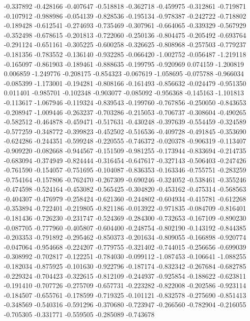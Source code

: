 -0.337892
-0.428166
-0.407647
-0.518818
-0.362718
-0.459975
-0.312861
-0.719871
-0.107912
-0.988986
-0.054139
-0.828536
-0.195134
-0.978387
-0.242722
-0.718802
-0.189428
-0.612541
-0.274693
-0.735469
-0.307961
-0.664065
-0.339329
-0.567929
-0.352498
-0.678615
-0.201813
-0.722060
-0.250136
-0.804475
-0.205492
-0.693764
-0.291124
-0.651161
-0.305225
-0.600258
-0.326625
-0.808968
-0.257503
-0.779237
-0.181356
-0.783552
-0.136140
-0.932285
-0.066420
-1.002752
-0.056487
-1.219118
-0.165097
-0.861903
-0.189461
-0.888635
-0.199795
-0.920969
0.074159
-1.200819
0.006859
-1.249776
-0.208175
-0.854323
-0.067619
-1.058695
-0.075788
-0.966034
-0.085399
-1.173001
-0.194281
-0.808166
-0.161493
-0.856632
-0.024479
-0.951350
0.011401
-0.985701
-0.102348
-0.903077
-0.085092
-0.956368
-0.145163
-1.101813
-0.113617
-1.067946
-0.119324
-0.839543
-0.199760
-0.767856
-0.250050
-0.843653
-0.208947
-1.009446
-0.263237
-0.703286
-0.215053
-0.706737
-0.308604
-0.490265
-0.582512
-0.464878
-0.459471
-0.517631
-0.430248
-0.397639
-0.554459
-0.324589
-0.577259
-0.348772
-0.399823
-0.452502
-0.516536
-0.409728
-0.491845
-0.353690
-0.624286
-0.244351
-0.599248
-0.220555
-0.746372
-0.020378
-0.906319
-0.113407
-0.909220
-0.082668
-0.944567
-0.151509
-0.981255
-0.173944
-0.833694
-0.214735
-0.683094
-0.374949
-0.824444
-0.316454
-0.647617
-0.327143
-0.506403
-0.247426
-0.761590
-0.154057
-0.751695
-0.104087
-0.836353
-0.163346
-0.755751
-0.283259
-0.754164
-0.157806
-0.762470
-0.267309
-0.690246
-0.324052
-0.538461
-0.355246
-0.474598
-0.524164
-0.453082
-0.565425
-0.304820
-0.453162
-0.475314
-0.568563
-0.404307
-0.476979
-0.258424
-0.621360
-0.244802
-0.604934
-0.415781
-0.612268
-0.353894
-0.722401
-0.219805
-0.821186
-0.013922
-0.971835
-0.084709
-0.816401
-0.181436
-0.726230
-0.231747
-0.524369
-0.284300
-0.732653
-0.167109
-0.890230
-0.087705
-0.777960
-0.405807
-0.604400
-0.248754
-0.802190
-0.143192
-0.844385
-0.203353
-0.791892
-0.295462
-0.850373
-0.201634
-0.809055
-0.166898
-0.920774
-0.047064
-0.954668
-0.224207
-0.779755
-0.321402
-0.744015
-0.256656
-0.699039
-0.308992
-0.702817
-0.122251
-0.784030
-0.099112
-1.087453
-0.106641
-1.088255
-0.182034
-0.875925
-0.101630
-0.922796
-0.187174
-0.832342
-0.267684
-0.682785
-0.229324
-0.704423
-0.322615
-0.812109
-0.244937
-0.925854
-0.188622
-0.623811
-0.191410
-0.707726
-0.275709
-0.657731
-0.223282
-0.822008
-0.202586
-0.923114
-0.184507
-0.655761
-0.178599
-0.719325
-0.101121
-0.832578
-0.275690
-0.851413
-0.348569
-0.540316
-0.591296
-0.370680
-0.723947
-0.266560
-0.782904
-0.216055
-0.705305
-0.331771
-0.559505
-0.285089
-0.743678
